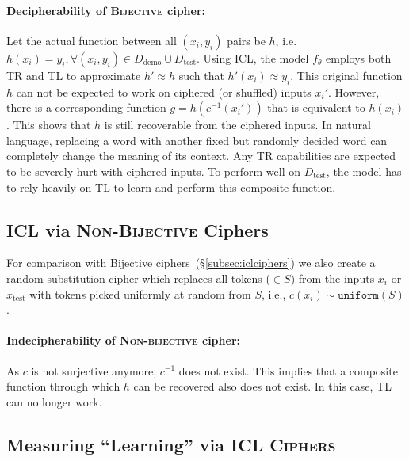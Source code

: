 \documentclass[11pt]{article}
\newcommand{\name}{\textsc{ICL Ciphers}}
\begin{document}
\paragraph{Decipherability of \textsc{Bijective} cipher:} Let the actual function between all $(x_i, y_i)$ pairs be $h$, i.e. $h(x_i) = y_i, \forall (x_i, y_i) \in D_\text{demo} \cup D_\text{test}$. Using ICL, the model $f_\theta$ employs both TR and TL to approximate $h' \approx h$ such that $h'(x_i) \approx y_i$. This original function $h$ can not be expected to work on ciphered (or shuffled) inputs $x_i'$. However, there is a corresponding function $g = h(c^{-1}(x_i'))$ that is equivalent to $h(x_i)$.
This shows that $h$ is still recoverable from the ciphered inputs. In natural language, replacing a word with another fixed but randomly decided word can completely change the meaning of its context. Any TR capabilities are expected to be severely hurt with ciphered inputs. To perform well on $D_\text{test}$, the model has to rely heavily on TL to learn and perform this composite function.

\subsection{ICL via \textsc{Non-Bijective} Ciphers}
\label{subsec:uninformative}

For comparison with Bijective ciphers~(\S\ref{subsec:iclciphers}) we also create a random substitution cipher which replaces all tokens ($\in S$) from the inputs $x_i$ or $x_\text{test}$ with tokens picked uniformly at random from $S$, i.e., $c(x_i) \sim \texttt{uniform}(S)$.

\paragraph{Indecipherability of \textsc{Non-bijective} cipher:} As $c$ is not surjective anymore, $c^{-1}$ does not exist. This implies that a composite function through which $h$ can be recovered also does not exist. In this case, TL can no longer work.

\subsection{Measuring ``Learning'' via \name{}}
\label{subsec:learning:measuring}
\end{document}
